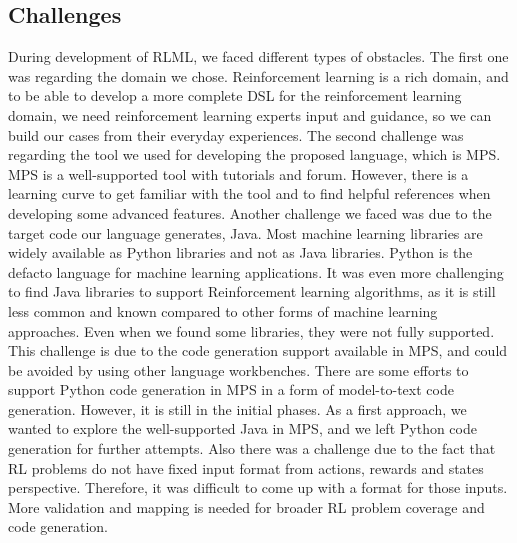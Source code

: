 \documentclass[11pt,letterpaper]{ryersonSGSThesis}
\begin{document}
\begin{ryersonSGSThesis}
    \section{Challenges}
    \label{section:challenges}
     During development of RLML, we faced different types of obstacles. The first one was regarding the domain we chose. Reinforcement learning is a rich domain, and to be able to develop a more complete DSL for the reinforcement learning domain, we need reinforcement learning experts input and guidance, so we can build our cases from their everyday experiences. The second challenge was regarding the tool we used for developing the proposed language, which is MPS. MPS is a well-supported tool with tutorials and forum. However, there is a learning curve to get familiar with the tool and to find helpful references when developing some advanced features. Another challenge we faced was due to the target code our language generates, Java. Most machine learning libraries are widely available as Python libraries and not as Java libraries. Python is the defacto language for machine learning applications. It was even more challenging to find Java libraries to support Reinforcement learning algorithms, as it is still less common and known compared to other forms of machine learning approaches. Even when we found some libraries, they were not fully supported. This challenge is due to the code generation support available in MPS, and could be avoided by using other language workbenches. There are some efforts to support Python code generation in MPS in a form of model-to-text code generation. However, it is still in the initial phases. As a first approach, we wanted to explore the well-supported Java in MPS, and we left Python code generation for further attempts.
     Also there was a challenge due to the fact that RL problems do not have fixed input format from actions, rewards and states perspective. Therefore, it was difficult to come up with a format for those inputs. More validation and mapping is needed for broader RL problem coverage and code generation.


\end{ryersonSGSThesis}
\end{document}
